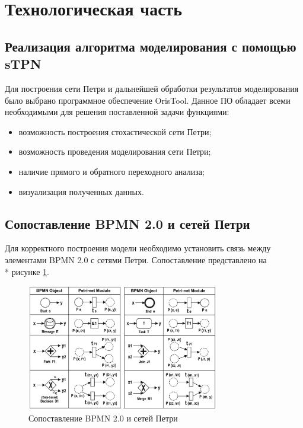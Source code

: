 \section{Технологическая часть}
\subsection{Реализация алгоритма моделирования с помощью sTPN}

Для построения сети Петри и дальнейшей обработки результатов моделирования было выбрано программное обеспечение OrisTool\cite{oris}. Данное ПО обладает всеми необходимыми для решения поставленной задачи функциями:

\begin{itemize}[label=---]
	\item возможность построения стохастической сети Петри;
	\item возможность проведения моделирования сети Петри;
	\item наличие прямого и обратного переходного анализа;
	\item визуализация полученных данных.
\end{itemize}

\subsection{Сопоставление BPMN 2.0 и сетей Петри}

Для корректного построения модели необходимо установить связь между элементами BPMN 2.0 с сетями Петри. Сопоставление представлено на \\* рисунке \ref{fig:mapping}.

\begin{figure}[h!btp]
	\centering
	\includegraphics[width=0.75\textwidth]{inc/mapping.png}
	\caption{Сопоставление BPMN 2.0 и сетей Петри}
	\label{fig:mapping}
\end{figure}


